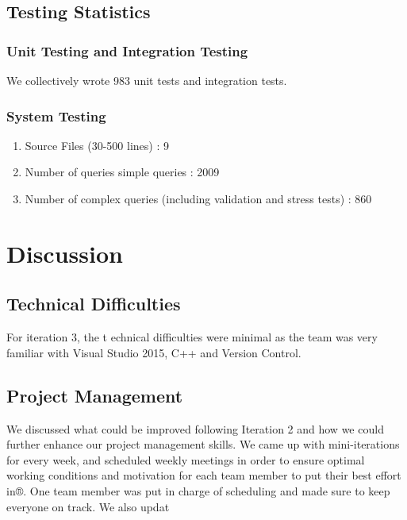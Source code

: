 \documentclass[12pt]{article}
\begin{document}
{{{{{{{{{{{{{\subsection{Testing Statistics}
\subsubsection{Unit Testing and Integration Testing}
We collectively wrote 983 unit tests and integration tests.
\subsubsection{System Testing}
\begin{enumerate}
\item Source Files (30-500 lines) : 9
\item Number of queries simple queries : 2009
\item Number of complex queries (including validation and stress tests) : 860

\end{enumerate}
\section{Discussion}
\subsection{Technical Difficulties}
For iteration 3, the t
echnical difficulties were minimal as the team was very familiar with Visual Studio 2015, C++ and Version Control.
\subsection{Project Management}
We discussed what could be improved following Iteration 2 and how we could further enhance our project management skills. We came up with mini-iterations for every week, and scheduled weekly meetings in 
order to ensure optimal working conditions and motivation for each team member to put their best effort in®. One team member was put in charge of scheduling and made sure to keep everyone on track. We also updat

























}}}}}}}}}}}}}
\end{document}

